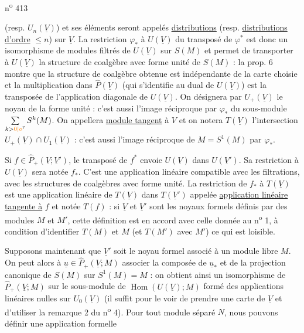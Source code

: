 \hfill n\textsuperscript{o} 413

(resp. $U_n(\underline V)$) et ses éléments seront appelés \uline{distributions} (resp. \uline{distributions d'ordre} $\leq n$) sur $\underline V$. La restriction $\varphi_*$ à $U(\underline V)$ du transposé de $\varphi^*$ est donc un isomorphisme de modules filtrés de $U(\underline V)$ sur $S(M)$ et permet de transporter à $U(\underline V)$ la structure de coalgèbre avec forme unité de $S(M)$ : la prop. 6 montre que la structure de coalgèbre obtenue est indépendante de la carte choisie et la multiplication dans $\widehat P(\underline V)$ (qui s'identifie au dual de $U(\underline V)$) est la transposée de l'application diagonale de $U(\underline V)$. On désignera par $U_+(\underline V)$ le noyau de la forme unité : c'est aussi l'image réciproque par $\varphi_*$ du sous-module $\sum\limits_{k>\unsure{0|o}}S^k(M)$. On appellera \uline{module tangent} à $V$ et on notera $T(\underline V)$ l'intersection $U_+(\underline V)\cap U_1(\underline V)$ : c'est aussi l'image réciproque de $M=S^1(M)$ par $\varphi_*$.

Si $f\in\widehat P_+(\underline V;\underline V')$, le transposé de $f^*$ envoie $U(\underline V)$ dans $U(\underline V')$. Sa restriction à $U(\underline V)$ sera notée $f_*$. C'est une application linéaire compatible avec les filtrations, avec les structures de coalgèbres avec forme unité. La restriction de $f_*$ à $T(\underline V)$ est une application linéaire de $T(\underline V)$ dans $T(\underline V')$ appelée \uline{application linéaire tangente à} $f$ et notée $T(f)$ : si $\underline V$ et $\underline V'$ sont les noyaux formels définis par des modules $M$ et $M'$, cette définition est en accord avec celle donnée au n\textsuperscript{o} 1, à condition d'identifier $T(M)$ et $M$ (et $T(M')$ avec $M'$) ce qui est loisible.

Supposons maintenant que $\underline V'$ soit le noyau formel associé à un module libre $M$. On peut alors à $\underline u\in\widehat P_+(\underline V;M)$ associer la composée de $\underline u_*$ et de la projection canonique de $S(M)$ sur $S^1(M)=M$ : on obtient ainsi un isomorphisme de $\widehat P_+(\underline V;M)$ sur le sous-module de $\operatorname{Hom}(U(\underline V);M)$ formé des applications linéaires nulles sur $U_0(\underline V)$ (il suffit pour le voir de prendre une carte de $\underline V$ et d'utiliser la remarque 2 du n\textsuperscript{o} 4). Pour tout module séparé $N$, nous pouvons définir une application formelle


